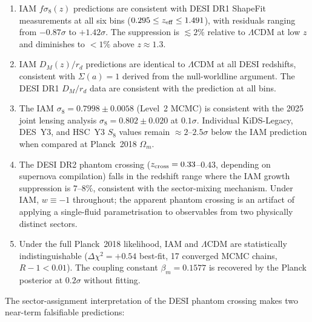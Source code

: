 \documentclass[12pt,a4paper]{article}
\newcommand{\lcdm}{$\Lambda$CDM}
\newcommand{\Dchi}{\Delta\chi^2}
\begin{document}
\begin{enumerate}
\item IAM $f\sigma_8(z)$ predictions are consistent with DESI DR1 ShapeFit
  measurements at all six bins ($0.295 \leq z_{\rm eff} \leq 1.491$),
  with residuals ranging from $-0.87\sigma$ to $+1.42\sigma$.
  The suppression is $\lesssim 2\%$ relative to \lcdm{} at low $z$
  and diminishes to $< 1\%$ above $z \approx 1.3$.

\item IAM $D_M(z)/r_d$ predictions are identical to \lcdm{} at all DESI
  redshifts, consistent with $\Sigma(a) = 1$ derived from the null-worldline
  argument.
  The DESI DR1 $D_M/r_d$ data are consistent with the prediction at all bins.

\item The IAM $\sigma_8 = 0.7998 \pm 0.0058$ (Level~2 MCMC) is consistent
  with the 2025 joint lensing analysis $\sigma_8 = 0.802 \pm 0.020$ at
  $0.1\sigma$.
  Individual KiDS-Legacy, DES~Y3, and HSC~Y3 $S_8$ values remain
  $\approx 2$--$2.5\sigma$ below the IAM prediction when compared at
  Planck~2018 $\Omega_m$.

\item The DESI DR2 phantom crossing ($z_{\rm cross} = 0.33$--$0.43$,
  depending on supernova compilation) falls in the redshift range where
  the IAM growth suppression is $7$--$8\%$, consistent with the
  sector-mixing mechanism.
  Under IAM, $w \equiv -1$ throughout; the apparent phantom crossing is
  an artifact of applying a single-fluid parametrisation to observables
  from two physically distinct sectors.

\item Under the full Planck~2018 likelihood, IAM and \lcdm{} are
  statistically indistinguishable ($\Dchi = +0.54$ best-fit, 17 converged
  MCMC chains, $R-1 < 0.01$).
  The coupling constant $\beta_m = 0.1577$ is recovered by the Planck
  posterior at $0.2\sigma$ without fitting.
\end{enumerate}

The sector-assignment interpretation of the DESI phantom crossing makes
two near-term falsifiable predictions:
\end{document}
